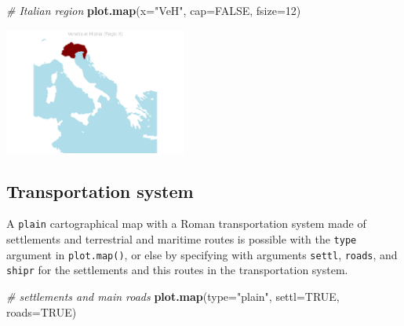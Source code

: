 \documentclass[a4paper,11pt]{memoir}
\newenvironment{Shaded}{\begin{snugshade}}{\end{snugshade}}
\newcommand{\CommentTok}[1]{\textcolor[rgb]{0.56,0.35,0.01}{\textit{#1}}}
\newcommand{\DataTypeTok}[1]{\textcolor[rgb]{0.13,0.29,0.53}{#1}}
\newcommand{\DecValTok}[1]{\textcolor[rgb]{0.00,0.00,0.81}{#1}}
\newcommand{\KeywordTok}[1]{\textcolor[rgb]{0.13,0.29,0.53}{\textbf{#1}}}
\newcommand{\NormalTok}[1]{#1}
\newcommand{\OtherTok}[1]{\textcolor[rgb]{0.56,0.35,0.01}{#1}}
\newcommand{\StringTok}[1]{\textcolor[rgb]{0.31,0.60,0.02}{#1}}
\begin{document}
\bigbreak
\bigbreak

\begin{Shaded}
\begin{Highlighting}[]
\CommentTok{# Italian region}
\KeywordTok{plot.map}\NormalTok{(}\DataTypeTok{x=}\StringTok{"VeH"}\NormalTok{, }\DataTypeTok{cap=}\OtherTok{FALSE}\NormalTok{, }\DataTypeTok{fsize=}\DecValTok{12}\NormalTok{)}
\end{Highlighting}
\end{Shaded}

{\centering
\includegraphics[width=6cm, trim=0 0 0 0, clip]{img/unnamed-chunk-7-1} %
}

\bigbreak
\bigbreak

\hypertarget{transportation-system}{%
\subsection{Transportation system}\label{transportation-system}}

A \texttt{plain} cartographical map with a Roman transportation system
made of settlements and terrestrial and maritime routes is possible with
the \texttt{type} argument in \texttt{plot.map()}, or else by specifying
with arguments \texttt{settl}, \texttt{roads}, and \texttt{shipr} for
the settlements and this routes in the transportation system.

\bigbreak
\bigbreak

\begin{Shaded}
\begin{Highlighting}[]
\CommentTok{# settlements and main roads}
\KeywordTok{plot.map}\NormalTok{(}\DataTypeTok{type=}\StringTok{"plain"}\NormalTok{, }\DataTypeTok{settl=}\OtherTok{TRUE}\NormalTok{, }\DataTypeTok{roads=}\OtherTok{TRUE}\NormalTok{)}
\end{Highlighting}
\end{Shaded}
\end{document}
